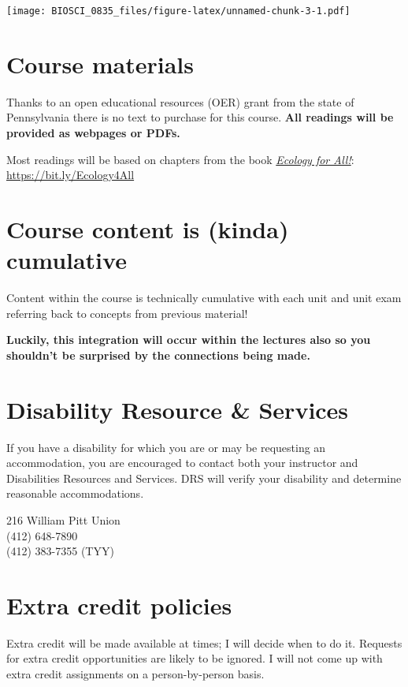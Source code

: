 \documentclass[
]{book}
\begin{document}
\texttt{[image: BIOSCI\_0835\_files/figure-latex/unnamed-chunk-3-1.pdf]}

\hypertarget{course-materials}{%
\chapter{Course materials}\label{course-materials}}

Thanks to an open educational resources (OER) grant from the state of Pennsylvania there is no text to purchase for this course. \textbf{All readings will be provided as webpages or PDFs.}

Most readings will be based on chapters from the book \href{https://bio.libretexts.org/Courses/Gettysburg_College/01\%3A_Ecology_for_All}{\emph{Ecology for All!}}: \url{https://bit.ly/Ecology4All}

\hypertarget{course-content-is-kinda-cumulative}{%
\chapter{Course content is (kinda) cumulative}\label{course-content-is-kinda-cumulative}}

Content within the course is technically cumulative with each unit and unit exam referring back to concepts from previous material!

\textbf{Luckily, this integration will occur within the lectures also so you shouldn't be surprised by the connections being made.}

\hypertarget{DRS}{%
\chapter{Disability Resource \& Services}\label{DRS}}

If you have a disability for which you are or may be requesting an accommodation, you are encouraged to contact both your instructor and Disabilities Resources and Services. DRS will verify your disability and determine reasonable accommodations.

216 William Pitt Union\\
(412) 648-7890\\
(412) 383-7355 (TYY)

\hypertarget{extracredit}{%
\chapter{Extra credit policies}\label{extracredit}}

Extra credit will be made available at times; I will decide when to do it. Requests for extra credit opportunities are likely to be ignored. I will not come up with extra credit assignments on a person-by-person basis.
\end{document}
